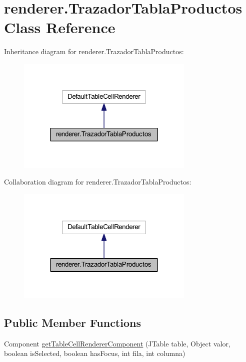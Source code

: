 \hypertarget{classrenderer_1_1_trazador_tabla_productos}{}\section{renderer.\+Trazador\+Tabla\+Productos Class Reference}
\label{classrenderer_1_1_trazador_tabla_productos}


Inheritance diagram for renderer.\+Trazador\+Tabla\+Productos\+:\nopagebreak
\begin{figure}[H]
\begin{center}
\leavevmode
\includegraphics[width=240pt]{classrenderer_1_1_trazador_tabla_productos__inherit__graph}
\end{center}
\end{figure}


Collaboration diagram for renderer.\+Trazador\+Tabla\+Productos\+:\nopagebreak
\begin{figure}[H]
\begin{center}
\leavevmode
\includegraphics[width=240pt]{classrenderer_1_1_trazador_tabla_productos__coll__graph}
\end{center}
\end{figure}
\subsection*{Public Member Functions}
\begin{DoxyCompactItemize}
\item 
Component \mbox{\hyperlink{classrenderer_1_1_trazador_tabla_productos_a0d15ae9262431f81b66258d7f445092c}{get\+Table\+Cell\+Renderer\+Component}} (J\+Table table, Object valor, boolean is\+Selected, boolean has\+Focus, int fila, int columna)
\end{DoxyCompactItemize}


